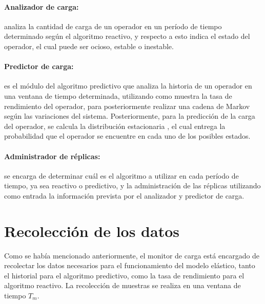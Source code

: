 \paragraph{Analizador de carga:} analiza la cantidad de carga de un operador en un per\'iodo de tiempo determinado seg\'un el algoritmo reactivo, y respecto a esto indica el estado del operador,  el cual puede ser ocioso, estable o inestable.

\paragraph{Predictor de carga:} es el m\'odulo del algoritmo predictivo que analiza la historia de un operador en una ventana de tiempo determinada, utilizando como muestra la tasa de rendimiento del operador, para posteriormente realizar una cadena de Markov seg\'un las variaciones del sistema. Posteriormente, para la predicci\'on de la carga del operador, se calcula la distribuci\'on estacionaria \citep{Papoulis1984}, el cual entrega la probabilidad que el operador se encuentre en cada uno de los posibles estados.

\paragraph{Administrador de r\'eplicas:} se encarga de determinar cu\'al es el algoritmo a utilizar en cada per\'iodo de tiempo, ya sea reactivo o predictivo, y la administraci\'on de las r\'eplicas utilizando como entrada la informaci\'on prevista por el analizador y predictor de carga.


\section{Recolecci\'on de los datos}

Como se hab\'ia mencionado anteriormente, el monitor de carga est\'a encargado de recolectar los datos necesarios para el funcionamiento del modelo el\'astico, tanto el historial para el algoritmo predictivo, como la tasa de rendimiento para el algoritmo reactivo. La recolecci\'on de muestras se realiza en una ventana de tiempo $T_m$.

